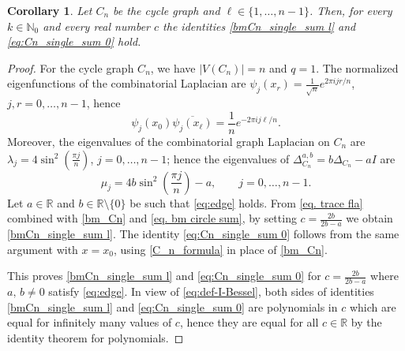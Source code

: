 \documentclass[reqno,10pt]{amsart}
\newtheorem{corollary}[theorem]{Corollary}
\theoremstyle{definition}
\numberwithin{equation}{section}
\begin{document}
\begin{corollary} \label{cor. trig sums gen}
Let $C_n$ be the cycle graph and 
$\ell\in\{1,\ldots,n-1\}$. Then, for every $k\in\mathbb N_0$ and every real number $c$ the
identities \eqref{bmCn_single_sum l} and \eqref{eq:Cn_single_sum 0} hold. 

\end{corollary}

\begin{proof}
For the cycle graph $C_n$, we have $|V(C_n)|=n$ and $q=1$. The normalized eigenfunctions of the combinatorial Laplacian are $\psi_j(x_r)=\frac1{\sqrt n}e^{2\pi i jr/n}$, $j,r=0,\ldots,n-1$,
hence
\[
\psi_j(x_0)\overline{\psi_j(x_\ell)}
=
\frac1n e^{-2\pi i j\ell/n}.
\]
Moreover, the eigenvalues of the combinatorial graph Laplacian on $C_n$ are
$\lambda_j=4\sin^2\!\left(\frac{\pi j}{n}\right)$, $j=0,\ldots,n-1$; hence the eigenvalues of $\Delta_{C_n}^{a,b}=b\Delta_{C_n}-aI$ are
\[
\mu_j=
4b\sin^2\!\left(\frac{\pi j}{n}\right)-a, \qquad j=0,\ldots,n-1.
\]
Let $a\in\mathbb R$ and $b\in\mathbb R\setminus\{0\}$ be such that
\eqref{eq:edge} holds. From \eqref{eq. trace fla} combined with \eqref{bm_Cn} and \eqref{eq. bm circle sum}, by setting $c=\frac{2b}{2b-a}$ we obtain \eqref{bmCn_single_sum l}.
The identity \eqref{eq:Cn_single_sum 0} follows from the same argument with
$x=x_0$, using \eqref{C_n_formula} in place of \eqref{bm_Cn}.

This proves \eqref{bmCn_single_sum l} and \eqref{eq:Cn_single_sum 0} for  $c=\frac{2b}{2b-a}$ where $a,\, b\neq 0$ satisfy \eqref{eq:edge}. In view of \eqref{eq:def-I-Bessel}, both sides of identities
\eqref{bmCn_single_sum l} and \eqref{eq:Cn_single_sum 0} are polynomials
in $c$ which are equal for infinitely many values of $c$, hence they are equal for all $c\in\mathbb R$ by the identity theorem for polynomials.
\end{proof}
\end{document}
